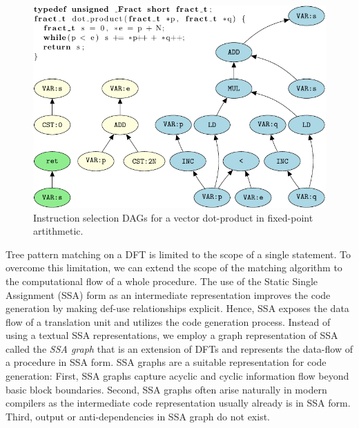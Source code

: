 \begin{figure}[ht]
\begin{center}

    \includegraphics{pgf-fig003}
  \end{center}
  \caption{Instruction selection DAGs for a vector dot-product in
    fixed-point artithmetic.}\label{fig:dot_product}
\end{figure}

Tree pattern matching on a DFT is limited to the scope of a single
statement.  To overcome this limitation, we can extend the scope of
the matching algorithm to the computational flow of a whole procedure.
The use of the Static Single Assignment (SSA) form as an intermediate
representation improves the code generation by making def-use
relationships explicit. Hence, SSA exposes the data flow of a
translation unit and utilizes the code generation process.  Instead of
using a textual SSA representations, we employ a graph representation
of SSA called the \emph{SSA graph} that is an extension of DFTs and
represents the data-flow of a procedure in SSA form.  SSA graphs are a
suitable representation for code generation: First, SSA graphs capture
acyclic and cyclic information flow beyond basic block
boundaries. Second, SSA graphs often arise naturally in modern
compilers as the intermediate code representation usually already is
in SSA form. Third, output or anti-dependencies in SSA graph do not
exist.

